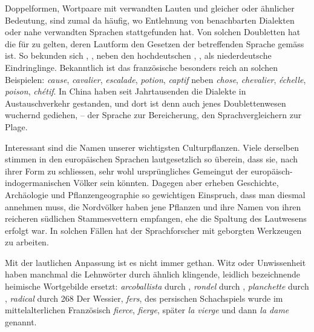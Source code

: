 {Doppelformen, Wortpaare mit verwandten Lauten und gleicher oder ähnlicher Bedeutung, sind zumal da häufig, wo Entlehnung von benachbarten Dialekten oder nahe verwandten Sprachen stattgefunden hat. Von solchen Doubletten hat die für  zu gelten, deren Lautform den Gesetzen der betreffenden Sprache gemäss ist. So bekunden sich , ,  neben den hochdeutschen , ,  als niederdeutsche Eindringlinge. Bekanntlich ist das französische besonders reich an solchen Beispielen: \textit{cause}, \textit{cavalier}, \textit{escalade}, \textit{potion}, \textit{captif} neben \textit{chose}, \textit{chevalier}, \textit{échelle}, \textit{poison}, \textit{chétif}. In China haben seit Jahrtausenden die Dialekte in Austauschverkehr gestanden, und dort ist denn auch jenes Doublettenwesen wuchernd gediehen, – der Sprache zur Bereicherung, den Sprachvergleichern zur Plage.

Interessant sind die Namen unserer wichtigsten Culturpflanzen. Viele derselben stimmen in den europäischen Sprachen lautgesetzlich so überein, dass sie, nach ihrer Form zu schliessen, sehr wohl ursprüng\-\label{fp.263}liches Gemeingut der europäisch-indogermanischen Völker sein könnten. Dagegen aber erheben Geschichte, Archäologie und Pflanzengeographie so gewichtigen Einspruch, dass man diesmal annehmen muss, die Nordvölker haben jene Pflanzen und ihre Namen von ihren reicheren südlichen Stammesvettern empfangen, ehe die Spaltung des Lautwesens erfolgt war. In solchen Fällen hat der Sprachforscher mit geborgten Werkzeugen zu arbeiten. 

Mit der lautlichen Anpassung ist es nicht immer gethan. Witz oder Unwissenheit haben manchmal die Lehnwörter durch ähnlich klingende, leidlich bezeichnende heimische Wortgebilde ersetzt: \textit{arcoballista} durch , \textit{rondel} durch , \textit{planchette} durch , \textit{radical} durch    268{\textbar}{\textbar}\label{sp.268} Der Wessier, \textit{fers}, des persischen Schachspiels wurde im mittelalterlichen Französisch \textit{fierce}, \textit{fierge}, später \textit{la vierge} und dann \textit{la dame} genannt.

}
